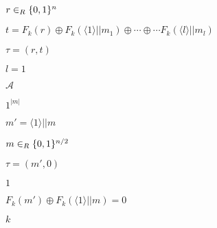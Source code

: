 \documentclass[10pt]{book}
\begin{document}
\begin{mdSnippets}
\begin{mdInlineSnippet}[f6c9b55d229e66db2ac6857d1791bffa]%
$r \in_R \{0,1\}^{n}$\end{mdInlineSnippet}%
\begin{mdInlineSnippet}%
$t = F_k(r) \oplus F_k(\langle 1 \rangle || m_1)\oplus \cdots \oplus \cdots F_k(\langle l \rangle || m_l)$\end{mdInlineSnippet}%
\begin{mdInlineSnippet}%
$\tau = (r, t)$\end{mdInlineSnippet}%
\begin{mdInlineSnippet}[9f3e00bebb8f8572780d9ce1255ae206]%
$l=1$\end{mdInlineSnippet}%
\begin{mdInlineSnippet}[ad70146b431bea9ae74cf8385470c544]%
$\mathcal{A}$\end{mdInlineSnippet}%
\begin{mdInlineSnippet}%
$1^{|m|}$\end{mdInlineSnippet}%
\begin{mdInlineSnippet}%
$m' =  \langle 1 \rangle || m$\end{mdInlineSnippet}%
\begin{mdInlineSnippet}[09c69b618be0eb9ac902337eda349a1d]%
$m \in_R \{0,1\}^{n/2}$\end{mdInlineSnippet}%
\begin{mdInlineSnippet}[bd603688bd276f50b1b9a51fca520d1e]%
$\tau = (m', 0)$\end{mdInlineSnippet}%
\begin{mdInlineSnippet}[c4ca4238a0b923820dcc509a6f75849b]%
$1$\end{mdInlineSnippet}%
\begin{mdInlineSnippet}[bac13a3e8216c8cc6a85357fd56a0491]%
$F_k(m') \oplus F_k(\langle 1 \rangle || m) = 0$\end{mdInlineSnippet}%
\begin{mdInlineSnippet}[8ce4b16b22b58894aa86c421e8759df3]%
$k$\end{mdInlineSnippet}%
\begin{mdInlineSnippet}[2db95e8e1a9267b7a1188556b2013b33]%

\end{mdInlineSnippet}
\end{mdSnippets}
\end{document}
